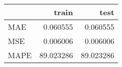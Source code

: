 \begin{tabular}{lrr}
\toprule
{} &      train &       test \\
\midrule
MAE  &   0.060555 &   0.060555 \\
MSE  &   0.006006 &   0.006006 \\
MAPE &  89.023286 &  89.023286 \\
\bottomrule
\end{tabular}
